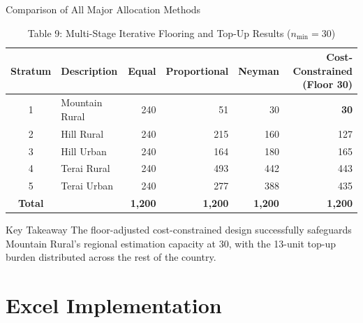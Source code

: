 \documentclass[10pt, aspectratio=169]{beamer}
\begin{document}
  \begin{frame}{Comparison of All Major Allocation Methods}
      \begin{table}
          \caption{Table 9: Multi-Stage Iterative Flooring and Top-Up Results ($n_{\min} = 30$)}
          \small
          \begin{tabularx}{\textwidth}{clrrrr}
              \toprule
              \textbf{Stratum} & \textbf{Description} & \textbf{Equal} & \textbf{Proportional} & \textbf{Neyman} & \textbf{Cost-Constrained (Floor 30)} \\
              \midrule
              1 & Mountain Rural & 240 & 51 & 30 & \cellcolor{green!15}\textbf{30} \\
              2 & Hill Rural & 240 & 215 & 160 & 127 \\
              3 & Hill Urban & 240 & 164 & 180 & 165 \\
              4 & Terai Rural & 240 & 493 & 442 & 443 \\
              5 & Terai Urban & 240 & 277 & 388 & 435 \\
              \midrule
              \textbf{Total} & & \textbf{1,200} & \textbf{1,200} & \textbf{1,200} & \textbf{1,200} \\
              \bottomrule
          \end{tabularx}
      \end{table}
      
      \begin{block}{Key Takeaway}
          The floor-adjusted cost-constrained design successfully safeguards Mountain Rural's regional estimation capacity at 30, with the 13-unit top-up burden distributed across the rest of the country.
      \end{block}
  \end{frame}
  
  \section{Excel Implementation}
  
\end{document}
